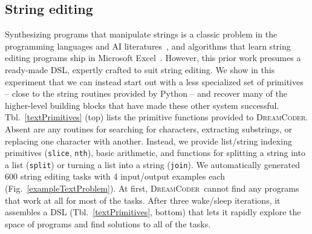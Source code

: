 \documentclass{article}
\newcommand{\system}{\textsc{DreamCoder}~}
\newcommand{\systemEnding}{\textsc{DreamCoder}}
\newcommand{\code}[1]{{\footnotesize\texttt{#1}}}
\begin{document}


\subsection{String editing}\label{textSection}
Synthesizing programs that manipulate strings is a classic problem in the
programming languages and AI literatures~\cite{menon2013machine,lau2001programming},
and algorithms that learn string editing programs ship in Microsoft Excel~\cite{gulwani2011automating}.
However, this prior work presumes a ready-made DSL,
expertly crafted to suit string editing.
We show in this experiment that we can instead start out with a
less specialized set of primitives -- close to the string routines provided by Python --
and recover many of the higher-level building blocks that have made these
other system successful.
Tbl.~\ref{textPrimitives} (top) lists the primitive functions provided to \systemEnding.
Absent are any routines for searching for characters, extracting substrings,
or replacing one character with another.
Instead, we provide list/string indexing primitives (\code{slice}, \code{nth}),
basic arithmetic, and functions for splitting a string into a list (\code{split})
or turning a list into a string (\code{join}).
We automatically generated  600 string editing tasks  with 4 input/output examples each (Fig.~\ref{exampleTextProblem}). %
At first, \system cannot find any programs that
work at all for most of the tasks.
After three wake/sleep iterations,
it assembles a DSL (Tbl.~\ref{textPrimitives}, bottom) that lets it rapidly explore the space of programs and find solutions to
all of the tasks.
\end{document}
